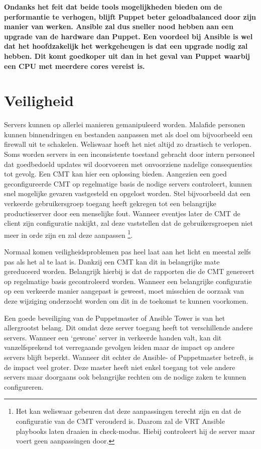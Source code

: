  \textbf{Ondanks het feit dat beide tools mogelijkheden bieden om de performantie te verhogen, blijft Puppet beter geloadbalanced door zijn manier van werken. Ansible zal dus sneller nood hebben aan een upgrade van de hardware dan Puppet. Een voordeel bij Ansible is wel dat het hoofdzakelijk het werkgeheugen is dat een upgrade nodig zal hebben. Dit komt goedkoper uit dan in het geval van Puppet waarbij een CPU met meerdere cores vereist is. }
 

 
 
 \section{Veiligheid}
 \label{sec:veiligheid}
Servers kunnen op allerlei manieren  gemanipuleerd worden. Malafide personen kunnen binnendringen en bestanden aanpassen met als doel om bijvoorbeeld een firewall uit te schakelen. Weliswaar hoeft het niet altijd zo drastisch te verlopen. Soms worden servers in een inconsistente toestand gebracht door intern personeel dat goedbedoeld updates wil doorvoeren met onvoorziene nadelige consequenties tot gevolg.
Een \gls{CMT} kan hier een oplossing bieden.  Aangezien een goed geconfigureerde \gls{CMT} op regelmatige basis de nodige servers controleert, kunnen snel mogelijke gevaren vastgesteld en opgelost worden. Stel bijvoorbeeld dat een verkeerde gebruikersgroep toegang heeft gekregen tot een belangrijke productieserver door een menselijke fout. Wanneer eventjes later de \gls{CMT} de client zijn configuratie nakijkt, zal deze vaststellen dat de gebruikersgroepen niet meer in orde zijn en zal deze aanpassen \footnote{Het kan weliswaar gebeuren dat deze aanpassingen terecht zijn en dat de configuratie van de \gls{CMT} verouderd is. Daarom zal de \gls{VRT} Ansible playbooks laten draaien in check-modus. Hiebij controleert hij de server maar voert geen aanpassingen door.}. 

Normaal komen veiligheidsproblemen pas heel laat aan het licht en meestal zelfs pas als het al te laat is. Dankzij een \gls{CMT} kan dit in belangrijke mate gereduceerd worden. Belangrijk hierbij is dat de rapporten die de \gls{CMT} genereert op regelmatige basis gecontroleerd worden.  Wanneer een belangrijke configuratie op een verkeerde manier aangepast is geweest, moet misschien de oorzaak van deze wijziging onderzocht worden om dit in de toekomst te kunnen voorkomen.

Een goede beveiliging van de Puppetmaster of Ansible Tower is van het allergrootst belang. Dit omdat deze server toegang heeft tot verschillende andere servers. Wanneer een ‘gewone' server in verkeerde handen valt, kan dit vanzelfsprekend tot verregaande gevolgen leiden maar de impact op andere servers blijft beperkt. Wanneer dit echter de Ansible- of Puppetmaster betreft, is de impact veel groter. Deze master heeft niet enkel toegang tot vele andere servers maar doorgaans ook belangrijke rechten om de nodige zaken te kunnen configureren.

